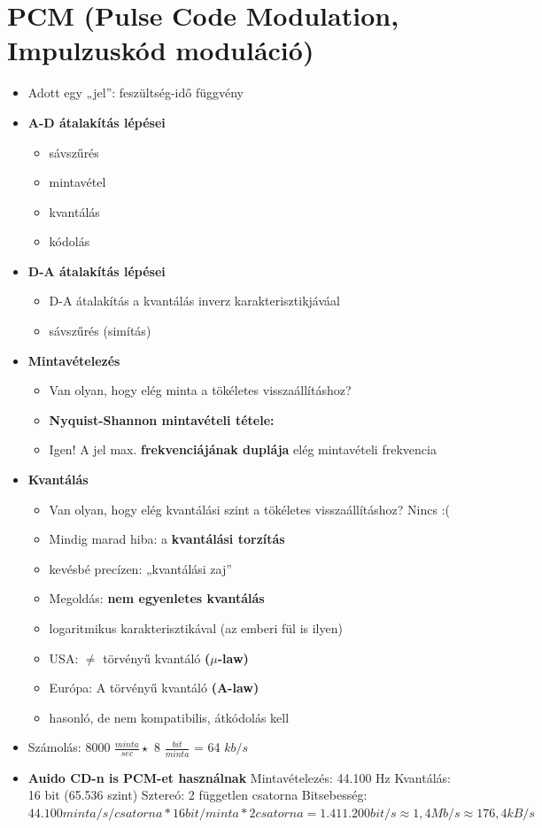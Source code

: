 \documentclass[10pt,a4paper]{article}
\begin{document}
\section{PCM (Pulse Code Modulation, Impulzuskód moduláció)}
\begin{itemize}
	\item Adott egy „jel”: feszültség-idő függvény
	\item \textbf{A-D átalakítás lépései}
\begin{itemize}
	\item sávszűrés
	\item mintavétel
	\item kvantálás
	\item kódolás
\end{itemize}
	\item \textbf{D-A átalakítás lépései}
\begin{itemize}
	\item D-A átalakítás a kvantálás inverz karakterisztikjáváal
	\item sávszűrés (simítás)
\end{itemize}
\item \textbf{Mintavételezés}
\begin{itemize}
	\item Van olyan, hogy elég minta a tökéletes
	visszaállításhoz?
	\item \textbf{Nyquist-Shannon mintavételi tétele:}
	\item Igen! A jel max. \textbf{frekvenciájának duplája} elég
	mintavételi frekvencia
\end{itemize}
\item \textbf{Kvantálás}
\begin{itemize}
	\item Van olyan, hogy elég kvantálási szint a tökéletes
	visszaállításhoz? Nincs :(
	\item Mindig marad hiba: a \textbf{kvantálási torzítás}
	\item kevésbé precízen: „kvantálási zaj”
	\item Megoldás: \textbf{nem egyenletes kvantálás}
	\item logaritmikus karakterisztikával (az emberi fül is ilyen)
	\item USA: $\neq$ törvényű kvantáló \textbf{($\mu$-law)}
	\item Európa: A törvényű kvantáló \textbf{(A-law)}
	\item hasonló, de nem kompatibilis, átkódolás kell
\end{itemize}
\item Számolás: 8000 $\frac{minta}{sec} \star$ 8 $\frac{bit}{minta}$ = 64 $kb/s$
\item \textbf{Auido CD-n is PCM-et használnak}
\subitem Mintavételezés: 44.100 Hz
\subitem Kvantálás: 16 bit (65.536 szint)
\subitem Sztereó: 2 független csatorna
\subitem Bitsebesség: $44.100 minta/s/csatorna * 16 bit/minta * 2 csatorna = 1.411.200 bit/s \approx 1,4 Mb/s \approx 176,4 kB/s$
\end{itemize}
\end{document}
